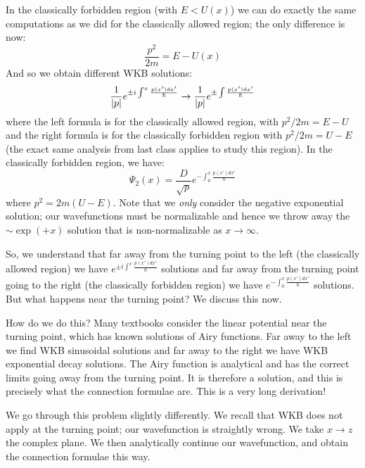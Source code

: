 In the classically forbidden region (with $E < U(x)$) we can do exactly the same computations as we did for the classically allowed region; the only difference is now:
\begin{equation}
    \frac{p^2}{2m} = E - U(x)
\end{equation}
And so we obtain different WKB solutions:
\begin{equation}
    \frac{1}{\lvert p \rvert}e^{\pm i \int^x \frac{p(x')dx'}{\hbar}} \to \frac{1}{\lvert p \rvert}e^{\pm \int \frac{p(x')dx'}{\hbar}}
\end{equation}
where the left formula is for the classically allowed region, with $p^2/2m = E - U$ and the right formula is for the classically forbidden region with $p^2/2m = U - E$ (the exact same analysis from last class applies to study this region). In the classically forbidden region, we have:
\begin{equation}
    \Psi_2(x) = \frac{D}{\sqrt{p}}e^{-\int_0^x \frac{p(x')dx'}{\hbar}}
\end{equation}
where $p^2 = 2m(U-E)$. Note that we \emph{only} consider the negative exponential solution; our wavefunctions must be normalizable and hence we throw away the $\sim \exp(+x)$ solution that is non-normalizable as $x \to \infty$.

So, we understand that far away from the turning point to the left (the classically allowed region) we have $e^{\pm i \int^x \frac{p(x')dx'}{\hbar}}$ solutions and far away from the turning point going to the right (the classically forbidden region) we have $e^{-\int_0^x \frac{p(x')dx'}{\hbar}}$ solutions. But what happens near the turning point? We discuss this now.

How do we do this? Many textbooks consider the linear potential near the turning point, which has known solutions of Airy functions. Far away to the left we find WKB sinusoidal solutions and far away to the right we have WKB exponential decay solutions. The Airy function is analytical and has the correct limits going away from the turning point. It is therefore a solution, and this is precisely what the connection formulae are. This is a very long derivation!

We go through this problem slightly differently. We recall that WKB does not apply at the turning point; our wavefunction is straightly wrong. We take $x \to z$ the complex plane. We then analytically continue our wavefunction, and obtain the connection formulae this way.

